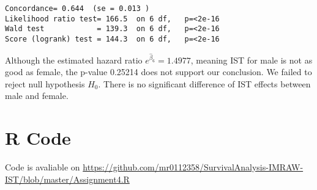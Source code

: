 \documentclass[11pt]{article}
\begin{document}
\begin{enumerate}
\begin{Verbatim}[fontsize=\small]
Concordance= 0.644  (se = 0.013 )
Likelihood ratio test= 166.5  on 6 df,   p=<2e-16
Wald test            = 139.3  on 6 df,   p=<2e-16
Score (logrank) test = 144.3  on 6 df,   p=<2e-16
\end{Verbatim}
Although the estimated hazard ratio $e^{\hat\beta_6}=1.4977$, meaning IST for
male is not as good as female, the p-value 0.25214 does not support our
conclusion. We failed to reject null hypothesis $H_0$. There is no significant
difference of IST effects between male and female.
\end{enumerate}


\appendix

\section{R Code}

Code is avaliable on \url{https://github.com/mr0112358/SurvivalAnalysis-IMRAW-IST/blob/master/Assignment4.R}
\end{document}
